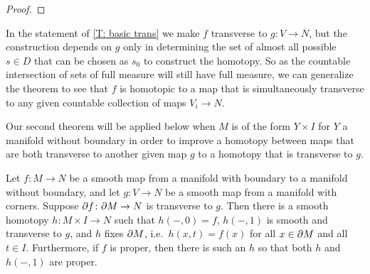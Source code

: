 \begin{proof}
	\begin{comment}
	If $f|_{\bd M}$ is already transverse to $g$, we modify the construction as follows: Let $\rho \colon M \to [0,1]$ be a smooth function that is $0$ on $\bd M$ and $>0$ on $M-\bd M$.
	Then we define
	$$H(x,s) = \pi(f(x)+ \epsilon(f(x))\rho(x)s).$$
	Then when $x \in \bd M$, we have $H(x,s) = \pi(f(x)) = f(x)$, so $h$ is constant along $\bd M$.
	For $x \notin \bd M$, the argument goes through exactly as above.
	\end{comment}
\end{proof}

\begin{remark}\label{R: countable trans}
	In the statement of \cref{T: basic trans} we make $f$ transverse to $g \colon V \to N$, but the construction depends on $g$ only in determining the set of almost all possible $s\in D$ that can be chosen as $s_0$ to construct the homotopy.
	So as the countable intersection of sets of full measure will still have full measure, we can generalize the theorem to see that $f$ is homotopic to a map that is simultaneously transverse to any given countable collection of maps $V_i \to N$.
\end{remark}

Our second theorem will be applied below when $M$ is of the form $Y \times I$ for $Y$ a manifold without boundary in order to improve a homotopy between maps that are both transverse to another given map $g$ to a homotopy that is transverse to $g$.

\begin{theorem}\label{T: homotopy trans}
	Let $f \colon M \to N$ be a smooth map from a manifold with boundary to a manifold without boundary, and let $g \colon V \to N$ be a smooth map from a manifold with corners.
	Suppose $\partial f \colon \partial M \to N$ is transverse to $g$.
	Then there is a smooth homotopy $h \colon M \times I \to N$ such that $h(-,0) = f$, $h(-,1)$ is smooth and transverse to $g$, and $h$ fixes $\partial M$, i.e.\ $h(x,t)=f(x)$ for all $x \in \partial M$ and all $t \in I$.
	Furthermore, if $f$ is proper, then there is such an $h$ so that both $h$ and $h(-,1)$ are proper.
\end{theorem}

